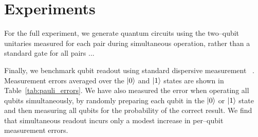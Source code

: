 \section{Experiments}
\label{sec:experiments}
For the full experiment, we generate quantum circuits using the two--qubit
unitaries measured for each pair during simultaneous operation, rather than a
standard gate for all pairs ...

Finally, we benchmark qubit readout using standard dispersive measurement
~\cite{wallraff2005approaching}. Measurement errors averaged over the $\ket{0}$
and $\ket{1}$ states are shown in Table~\ref{tab:pauli_errors}. We have also
measured the error when operating all qubits simultaneously, by randomly
preparing each qubit in the $\ket{0}$ or $\ket{1}$ state and then measuring all
qubits for the probability of the correct result. We find that simultaneous
readout incurs only a modest increase in per--qubit measurement errors.

